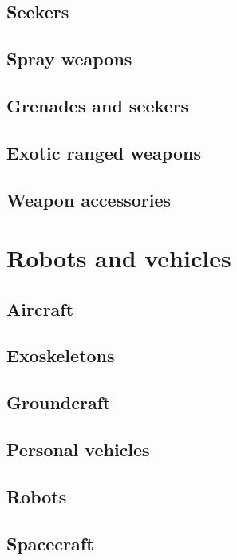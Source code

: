\subsection{Seekers}
\label{sec:seekers}

\subsection{Spray weapons}
\label{sec:spray-weapons}

\subsection{Grenades and seekers}
\label{sec:grenades-seekers}

\subsection{Exotic ranged weapons}
\label{sec:exotic-ranged-weapons}

\subsection{Weapon accessories}
\label{sec:weapon-accessories}

\section{Robots and vehicles}
\label{sec:robots-vehicles}

\subsection{Aircraft}
\label{sec:aircraft}

\subsection{Exoskeletons}
\label{sec:exoskeletons}

\subsection{Groundcraft}
\label{sec:groundcraft}

\subsection{Personal vehicles}
\label{sec:personal-vehicles}

\subsection{Robots}
\label{sec:robots}

\subsection{Spacecraft}
\label{sec:spacecraft}

